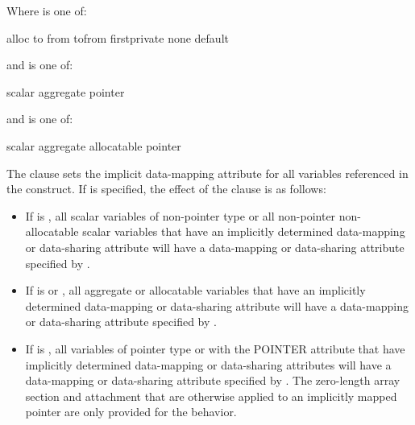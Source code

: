 Where  is one of:
\begin{indentedcodelist}
  alloc
  to
  from
  tofrom
  firstprivate
  none
  default
\end{indentedcodelist}

\begin{ccppspecific}
and  is one of:
\begin{indentedcodelist}
  scalar
  aggregate
  pointer
\end{indentedcodelist}
\end{ccppspecific}

\begin{fortranspecific}
and  is one of:
\begin{indentedcodelist}
  scalar
  aggregate
  allocatable
  pointer
\end{indentedcodelist}
\end{fortranspecific}

\descr
The  clause sets the implicit data-mapping attribute for 
all variables referenced in the construct. If  is 
specified, the effect of the  clause is as follows:

\begin{itemize}
\item If  is , all scalar variables of
      non-pointer type or all non-pointer non-allocatable scalar variables that
      have an implicitly determined data-mapping or data-sharing attribute will
      have a data-mapping or data-sharing attribute specified by
      .
\item If  is  or ,
      all aggregate or allocatable variables that have an implicitly determined
      data-mapping or data-sharing attribute will have a data-mapping or
      data-sharing attribute specified by .
\item If  is , all variables of pointer
      type or with the POINTER attribute that have implicitly determined
      data-mapping or data-sharing attributes will have a data-mapping or
      data-sharing attribute specified by .  The
      zero-length array section and attachment that are otherwise applied to
      an implicitly mapped pointer are only provided for the  behavior.
\end{itemize}

